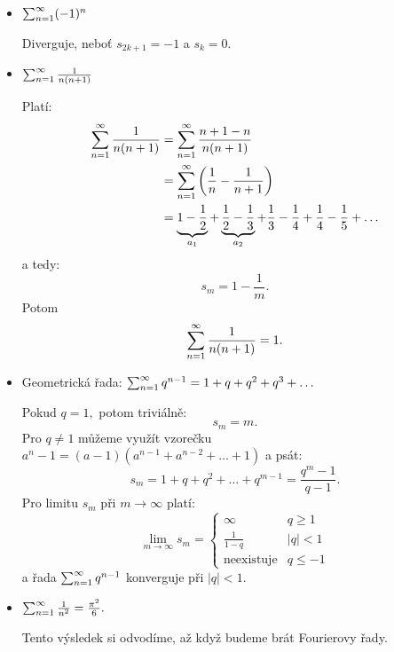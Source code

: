 \begin{example}
    \label{ex:priklady_rad}
    \leavevmode
    \begin{itemize}
        \item $\sum_{n=1}^\infty (-1)^n$
            
            Diverguje, neboť $s_{2k+1}=-1$ a $s_{k} = 0.$

        \item $\sum_{n=1}^\infty \frac{1}{n(n+1)}$
            
            Platí:
            \begin{align*}
                \sum_{n=1}^\infty \frac{1}{n(n+1)}
                &= \sum_{n=1}^\infty \frac{n + 1 - n}{n(n+1)} \\
                &= \sum_{n=1}^\infty \left(\frac{1}{n} - \frac{1}{n+1}\right) \\
                &= \underbrace{1 - \frac{1}{2}}_{a_1}
                   + \underbrace{\frac{1}{2} - \frac{1}{3}}_{a_2} 
                   + \frac{1}{3} - \frac{1}{4} 
                   + \frac{1}{4} - \frac{1}{5} + \dots
            \end{align*}
            a tedy:
            $$s_m = 1 - \frac{1}{m}.$$
            Potom 
            $$\sum_{n=1}^\infty \frac{1}{n(n+1)} = 1.$$

        \item Geometrická řada: $\sum_{n=1}^\infty q^{n-1} = 1 + q + q^2 + q^3 + \dots$

            Pokud $q = 1,$ potom triviálně:
            $$s_m = m.$$
            Pro $q \neq 1$ můžeme využít vzorečku $a^n -1 = (a-1)(a^{n-1} 
            + a^{n-2} + \dots + 1)$ a psát:
            $$s_m = 1 + q + q^2 + \dots + q^{m-1} = \frac{q^m - 1}{q-1}.$$
            Pro limitu $s_m$ při $m \to \infty$ platí:
            $$\lim_{m\to\infty} s_m = \begin{cases}
                \infty &q\geq1 \\
                \frac{1}{1-q} &|q|<1 \\
                \text{neexistuje} &q\leq-1
            \end{cases}$$
            a řada $\sum_{n=1}^\infty q^{n-1}$ konverguje při $|q| < 1.$
            
        \item $\sum_{n=1}^\infty \frac{1}{n^2} = \frac{\pi^2}{6}.$

            Tento výsledek si odvodíme, až když budeme brát Fourierovy řady.
    \end{itemize}
\end{example}

